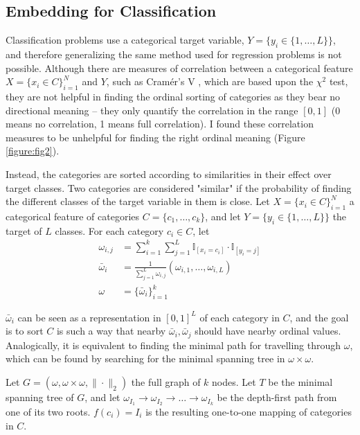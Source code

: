 \documentclass{article}
\begin{document}
\subsection{Embedding for Classification}
Classification problems use a categorical target variable, $Y=\{y_i \in \{1, \dots, L\}\}$, and therefore generalizing the same method used for regression problems is not possible. Although there are measures of correlation between a categorical feature $X=\{x_i \in C\}_{i=1}^N$ and $Y$, such as Cramér's V \cite{cramer1999mathematical}, which are based upon the $\chi^2$ test, they are not helpful in finding the ordinal sorting of categories as they bear no directional meaning -- they only quantify the correlation in the range $[0,1]$ (0 means no correlation, 1 means full correlation). I found these correlation measures to be unhelpful for finding the right ordinal meaning (Figure \ref{figure:fig2}).

Instead, the categories are sorted according to similarities in their effect over target classes. Two categories are considered "similar" if the probability of finding the different classes of the target variable in them is close. Let  $X=\{x_i \in C\}_{i=1}^N$ a categorical feature of categories $C=\{c_1,\dots,c_k\}$, and let $Y=\{y_i \in \{1, \dots, L\}\}$ the target of $L$ classes. For each category $c_i \in C$, let 
\begin{align*}
\omega_{i,j} & = \sum_{i=1}^k \sum_{j=1}^L \mathbb{I}_{[x_i = c_i]} \cdot \mathbb{I}_{[y_i = j]} \\
\bar{\omega}_i & = \frac{1}{\sum_{j=1}^L \omega_{i,j}} (\omega_{i,1}, \dots, \omega_{i, L}) \\
\omega &= \{\bar{\omega}_i \}_{i=1}^k
\end{align*}

$\bar{\omega}_i$ can be seen as a representation in $[0,1]^L$ of each category in $C$, and the goal is to sort $C$ is such a way that nearby $\bar{\omega}_i, \bar{\omega}_j$ should have nearby ordinal values. Analogically, it is equivalent to finding the minimal path for travelling through $\omega$, which can be found by searching for the minimal spanning tree in $\omega \times \omega$.

Let $G=(\omega, \omega \times \omega, \|\cdot\|_2)$ the full graph of $k$ nodes. Let $T$ be the minimal spanning tree of $G$, and let $\omega_{I_1} \to \omega_{I_2} \to \dots \to \omega_{I_k}$ be the depth-first path from one of its two roots. $f(c_i) = I_i$ is the resulting one-to-one mapping of categories in $C$.
\end{document}
